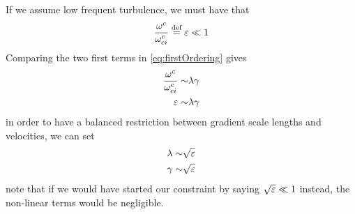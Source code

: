 %
If we assume low frequent turbulence, we must have that
%
\begin{align*}
    \frac{\omega^c}{\omega^c_{ci}} \overset{\text{def}}{=} \varepsilon \ll 1
\end{align*}
%
Comparing the two first terms in \cref{eq:firstOrdering} gives
%
\begin{align*}
 \frac{\omega^c}{\omega^c_{ci}}
 \sim&
 \lambda
 \gamma
 \\
 \varepsilon
 \sim&
 \lambda
 \gamma
\end{align*}
%
in order to have a balanced restriction between gradient scale lengths and velocities, we can set
%
\begin{align*}
 \lambda
 \sim&
 \sqrt{\varepsilon}
 \\
 \gamma
 \sim&
 \sqrt{\varepsilon}
\end{align*}
%
note that if we would have started our constraint by saying $\sqrt{\varepsilon}\ll 1$ instead, the non-linear terms would be negligible.

